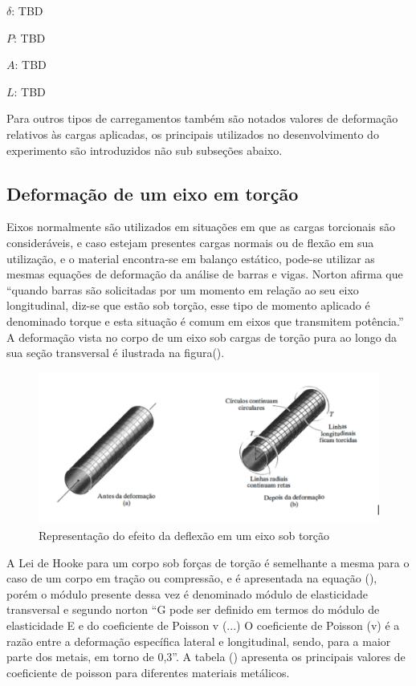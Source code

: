 $\delta $: TBD

$P$: TBD

$A$: TBD

$L$: TBD

\hfill

Para outros tipos de carregamentos também são notados valores de deformação relativos às cargas aplicadas, os principais utilizados no desenvolvimento do experimento são introduzidos não sub subseções abaixo.

\subsection{Deformação de um eixo em torção}

Eixos normalmente são utilizados em situações em que as cargas torcionais são consideráveis, e caso estejam presentes cargas normais ou de flexão em sua utilização, e o material encontra-se em balanço estático, pode-se utilizar as mesmas equações de deformação da análise de barras e vigas. Norton afirma que “quando barras são solicitadas por um momento em relação ao seu eixo longitudinal, diz-se que estão sob torção, esse tipo de momento aplicado é denominado torque e esta situação é comum em eixos que transmitem potência.” A deformação vista no corpo de um eixo sob cargas de torção pura ao longo da sua seção transversal é ilustrada na figura().

\begin{figure}[htb]
	\caption{\label{fig:1040} Representação do efeito da deflexão em um eixo sob torção}
	\begin{center}
		\includegraphics[width=\textwidth]{pictures/1040.png}
	\end{center}
\end{figure}

A Lei de Hooke para um corpo sob forças de torção é semelhante a mesma para o caso de um corpo em tração ou compressão, e é apresentada na equação (), porém o módulo presente dessa vez é denominado módulo de elasticidade transversal e segundo norton “G pode ser definido em termos do módulo de elasticidade E e do coeficiente de Poisson v (...) O coeficiente de Poisson (v) é a razão entre a deformação específica lateral e longitudinal, sendo, para a maior parte dos metais, em torno de 0,3”. A tabela () apresenta os principais valores de coeficiente de poisson para diferentes materiais metálicos.

